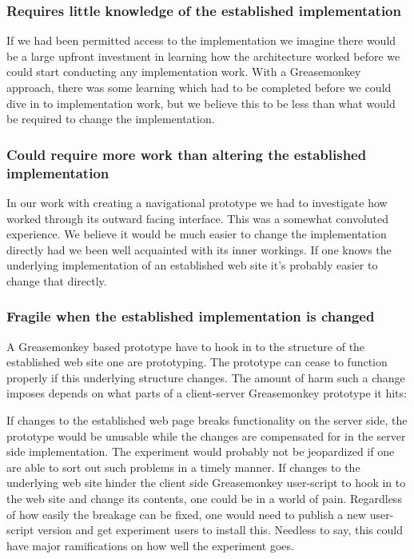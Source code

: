 \subsubsection{Requires little knowledge of the established implementation}

If we had been permitted access to the \urort{} implementation we imagine
there would be a large upfront investment in learning how the \urort{}
architecture worked before we could start conducting any implementation work.
With a Greasemonkey approach, there was some learning which had to be
completed before we could dive in to implementation work, but we believe this
to be less than what would be required to change the \urort{} implementation.

\subsubsection{Could require more work than altering the established
  implementation}

In our work with creating a navigational prototype we had to investigate how
\urort{} worked through its outward facing interface. This was a somewhat
convoluted experience.
We believe it would be much easier to change the \urort{} implementation
directly had we been well acquainted with its inner workings.
If one knows the underlying implementation of an established web site it's
probably easier to change that directly.

\subsubsection{Fragile when the established implementation is changed}

A Greasemonkey based prototype have to hook in to the structure of the
established web site one are prototyping. The prototype can cease to function
properly if this underlying structure changes. The amount of harm such a
change imposes depends on what parts of a client-server Greasemonkey prototype
it hits:

\begin{items}
   If changes to the established web page breaks
    functionality on the server side, the prototype would be unusable
    while the changes are compensated for in the server side implementation.
    The experiment would probably not be jeopardized if
    one are able to sort out such problems in a timely manner.
   If changes to the underlying web site hinder the client
    side Greasemonkey user-script to hook in to the web site and change its
    contents, one could be in a world of pain. Regardless of how easily the
    breakage can be fixed, one would need to publish a new user-script version
    and get experiment users to install this. Needless to say, this could
    have major ramifications on how well the experiment goes.
\end{items}

